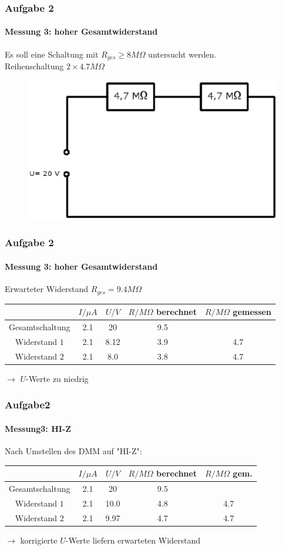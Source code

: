 \begin{frame}
\frametitle{Aufgabe 2}
\framesubtitle{Messung 3: hoher Gesamtwiderstand}
    Es soll eine Schaltung mit $R_{ges} \geq 8M \Omega$ untersucht werden.\\
    Reihenschaltung $2 \times 4.7M\Omega$ 
    \begin{figure}[H]
    \begin{center}
            \includegraphics[scale=0.6]{./img/reihenschaltung.eps}
    \end{center}
    \end{figure}
    
\end{frame}
\begin{frame}
\frametitle{Aufgabe 2}
\framesubtitle{Messung 3: hoher Gesamtwiderstand}
    Erwarteter Widerstand $R_{ges} = 9.4 M\Omega$
    \begin{tabular}{c| c c|c|c}
    \hline
    & $I/\mu A$ & $U/V$ & $R/M\Omega$ berechnet& $R/M\Omega$ gemessen \\
                \hline
    Gesamtschaltung & 2.1&20&9.5&\\
    Widerstand $1$  & 2.1&8.12&3.9&4.7 \\
    Widerstand $2$  & 2.1&8.0&3.8&4.7  \\
    \end{tabular}
    $\rightarrow$ $U$-Werte zu niedrig \\
\end{frame}
\begin{frame}
\frametitle{Aufgabe2}
\framesubtitle{Messung3: HI-Z}
Nach Umstellen des DMM auf "HI-Z":
    \begin{tabular}{c| c c|c|c}
    \hline
    & $I/\mu A$ & $U/V$ & $R/M\Omega$ berechnet& $R/M\Omega$ gem. \\
                \hline
    Gesamtschaltung & 2.1&20&9.5&\\
    Widerstand $1$  & 2.1&10.0&4.8&4.7 \\
    Widerstand $2$  & 2.1&9.97&4.7&4.7  \\
    \end{tabular}
    $\rightarrow$ korrigierte $U$-Werte liefern erwarteten Widerstand 
\end{frame}
